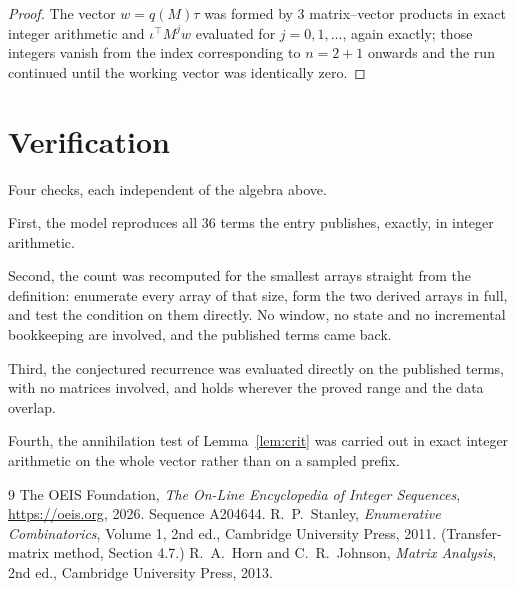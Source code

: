 \documentclass[11pt,a4paper]{article}
\theoremstyle{plain}
\theoremstyle{definition}
\begin{document}
\begin{proof}
The vector $w=q(M)\tau$ was formed by $3$ matrix--vector products in exact integer
arithmetic and $\iota^{\!\top}M^{j}w$ evaluated for $j=0,1,\dots$, again exactly; those
integers vanish from the index corresponding to $n=2+1$ onwards and the run continued
until the working vector was identically zero.
\end{proof}

\section{Verification}

Four checks, each independent of the algebra above.

First, the model reproduces all $36$ terms the entry publishes, exactly, in integer
arithmetic.

Second, the count was recomputed for the smallest arrays straight from the definition:
enumerate every array of that size, form the two derived arrays in full, and test the condition
on them directly. No window, no state and no incremental bookkeeping are involved, and the
published terms came back.

Third, the conjectured recurrence was evaluated directly on the published terms, with no
matrices involved, and holds wherever the proved range and the data overlap.

Fourth, the annihilation test of Lemma~\ref{lem:crit} was carried out in exact integer
arithmetic on the whole vector rather than on a sampled prefix.

\begin{thebibliography}{9}
 The OEIS Foundation, \emph{The On-Line Encyclopedia of Integer
Sequences}, \url{https://oeis.org}, 2026. Sequence A204644.
 R.~P.~Stanley, \emph{Enumerative Combinatorics}, Volume 1, 2nd ed.,
Cambridge University Press, 2011. (Transfer-matrix method, Section 4.7.)
 R.~A.~Horn and C.~R.~Johnson, \emph{Matrix Analysis}, 2nd ed., Cambridge
University Press, 2013.
\end{thebibliography}
\end{document}
